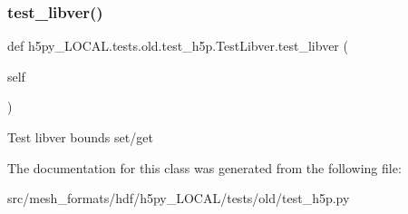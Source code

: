\subsubsection{\texorpdfstring{test\+\_\+libver()}{test\_libver()}}
{\footnotesize\ttfamily def h5py\+\_\+\+L\+O\+C\+A\+L.\+tests.\+old.\+test\+\_\+h5p.\+Test\+Libver.\+test\+\_\+libver (\begin{DoxyParamCaption}\item[{}]{self }\end{DoxyParamCaption})}

\begin{DoxyVerb}Test libver bounds set/get \end{DoxyVerb}
 

The documentation for this class was generated from the following file\+:\begin{DoxyCompactItemize}
\item 
src/mesh\+\_\+formats/hdf/h5py\+\_\+\+L\+O\+C\+A\+L/tests/old/test\+\_\+h5p.\+py\end{DoxyCompactItemize}
